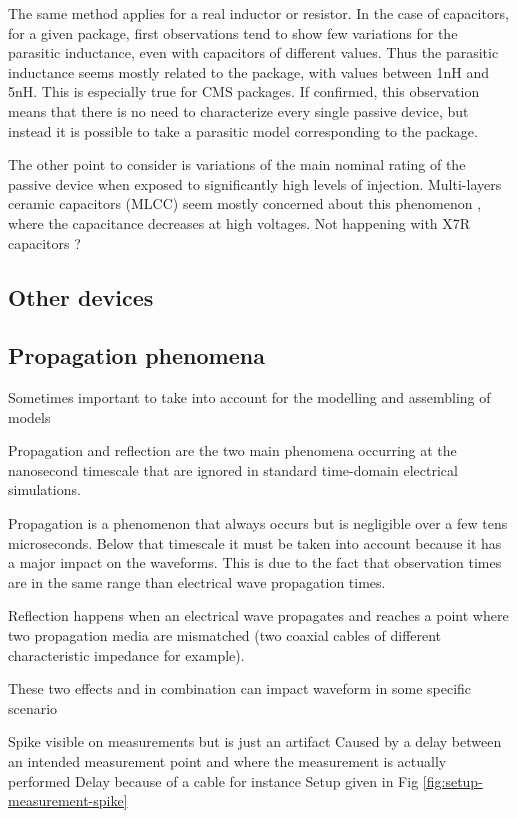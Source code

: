 The same method applies for a real inductor or resistor.
In the case of capacitors, for a given package, first observations tend to show few variations for the parasitic inductance, even with capacitors of different values.
Thus the parasitic inductance seems mostly related to the package, with values between 1nH and 5nH.
This is especially true for CMS packages.
If confirmed, this observation means that there is no need to characterize every single passive device, but instead it is possible to take a parasitic model corresponding to the package.

The other point to consider is variations of the main nominal rating of the passive device when exposed to significantly high levels of injection. Multi-layers ceramic capacitors (MLCC) seem mostly concerned about this phenomenon \cite{capa-esd-cz}, where the capacitance decreases at high voltages.
Not happening with X7R capacitors ?

\subsection{Other devices}

\subsection{Propagation phenomena}

Sometimes important to take into account for the modelling and assembling of models

Propagation and reflection are the two main phenomena occurring at the nanosecond timescale that are ignored in standard time-domain electrical simulations.

Propagation is a phenomenon that always occurs but is negligible over a few tens microseconds.
Below that timescale it must be taken into account because it has a major impact on the waveforms.
This is due to the fact that observation times are in the same range than electrical wave propagation times.

Reflection happens when an electrical wave propagates and reaches a point where two propagation media are mismatched (two coaxial cables of different characteristic impedance for example).

These two effects and in combination can impact waveform in some specific scenario

Spike visible on measurements but is just an artifact
Caused by a delay between an intended measurement point and where the measurement is actually performed
Delay because of a cable for instance
Setup given in Fig \ref{fig:setup-measurement-spike}

